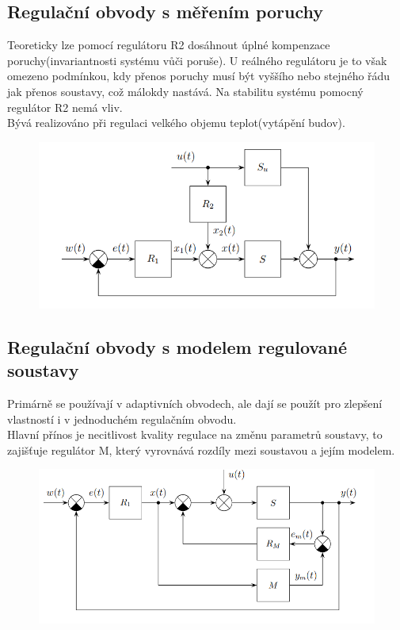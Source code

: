 \subsection*{Regulační obvody s měřením poruchy}
Teoreticky lze pomocí regulátoru R2 dosáhnout úplné kompenzace poruchy(invariantnosti systému vůči poruše). U reálného regulátoru je to však omezeno podmínkou, kdy přenos poruchy musí být vyššího nebo stejného řádu jak přenos soustavy, což málokdy nastává. Na stabilitu systému pomocný regulátor R2 nemá vliv.\\
Bývá realizováno při regulaci velkého objemu teplot(vytápění budov).
\begin{figure}[H]
    \includegraphics*[scale = 1]{images/pomocnaPorucha.png}
\end{figure}

\subsection*{Regulační obvody s modelem regulované soustavy}
Primárně se používají v adaptivních obvodech, ale dají se použít pro zlepšení vlastností i v jednoduchém regulačním obvodu.\\
Hlavní přínos je necitlivost kvality regulace na změnu parametrů soustavy, to zajišťuje regulátor M, který vyrovnává rozdíly mezi soustavou a jejím modelem.
\begin{figure}[H]
    \includegraphics*[scale = 1]{images/pomocnaModelRegulovaneSoustavy.png}
\end{figure}
\newpage

